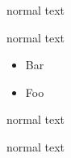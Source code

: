 \documentclass{beamer}
\begin{document}
\begin{frame}

normal text

normal text

\begin{itemize}
\item Bar
\item Foo
\end{itemize}

normal text

normal text

\end{frame}
\end{document}
